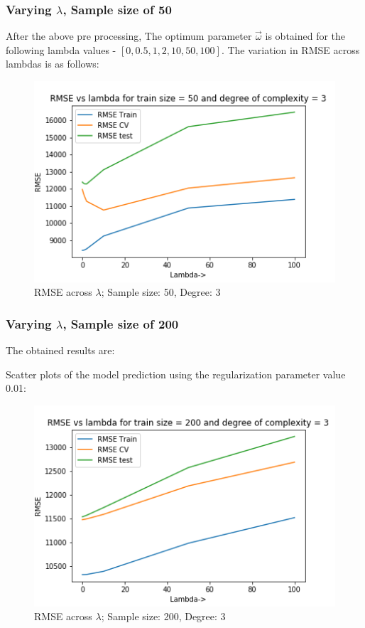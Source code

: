 \documentclass[12pt,a4paper]{article}
\newcommand{\noi}{\noindent}
\begin{document}
\subsubsection{Varying $\lambda$, Sample size of 50}
 
After the above pre processing, The optimum parameter \textbf{$\vec{\omega}$} is obtained for the following lambda values - $[0, 0.5, 1, 2, 10, 50, 100]$. The variation in RMSE across lambdas is as follows:


\begin{figure}[H]
     \centering
     \includegraphics[scale=0.7]{images/d3_50.png}
     \caption{RMSE across $\lambda$; Sample size: 50, Degree: 3}
     \label{fig:d350}
\end{figure}
 
\subsubsection{Varying $\lambda$, Sample size of 200}
The obtained results are:

\noi
Scatter plots of the model prediction using the regularization parameter value 0.01:
 
\begin{figure}[H]
     \centering
     \includegraphics[scale=0.7]{images/d3_200.png}
     \caption{RMSE across $\lambda$; Sample size: 200, Degree: 3}
     \label{fig:d3200}
\end{figure}
 
\end{document}
